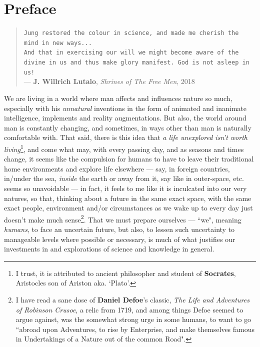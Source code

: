 \documentclass[a4paper, 18pt]{book} %
\begin{document}
\chapter{Preface}

\begin{quotation}
\noindent \texttt{Jung restored the colour in science, and made me cherish the mind in new ways...}\\
\texttt{And that in exercising our will we might become aware of the divine in us and thus make glory manifest. God is not asleep in us!}\\
\hspace*{\fill} --- \textbf{J. Willrich Lutalo}, \textit{Shrines of The Free Men}, 2018\cite{shrinesjwl}
\end{quotation}

We are living in a world where man affects and influences nature so much, especially with his \textit{unnatural} inventions in the form of animated and inanimate intelligence, implements and reality augmentations. But also, the world around man is constantly changing, and sometimes, in ways other than man is naturally comfortable with. That said, there is this idea that \textit{a life unexplored isn't worth living}\footnote{I trust, it is attributed to ancient philosopher and student of \textbf{Socrates}, Aristocles son of Ariston aka. `Plato'.}, and come what may, with every passing day, and as seasons and times change, it seems like the compulsion for humans to have to leave their traditional home environments and explore life elsewhere --- say, in foreign countries, in/under the sea, \textit{inside} the earth or away from it, say like in outer-space, etc. seems so unavoidable --- in fact, it feels to me like it is inculcated into our very natures, so that, thinking about a future in the same exact space, with the same exact people, environment and/or circumstances as we wake up to every day just doesn't make much sense\footnote{I have read a sane dose of \textbf{Daniel Defoe}'s classic, \textit{The Life and Adventures of Robinson Crusoe}, a relic from 1719, and among things Defoe seemed to argue against, was the somewhat strong urge in some humans, to want to go ``abroad upon Adventures, to rise by Enterprise, and make themselves famous in Undertakings of a Nature out of the common Road".}. That we must prepare ourselves --- ``we", meaning \textit{humans}, to face an uncertain future, but also, to lessen such uncertainty to manageable levels where possible or necessary, is much of what justifies our investments in and explorations of science and knowledge in general. 
\end{document}
